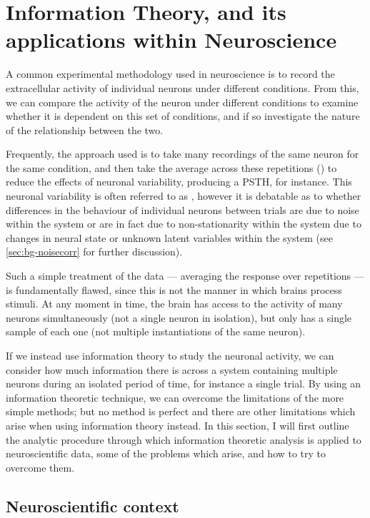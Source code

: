 \section{Information Theory, and its applications within Neuroscience}
\label{sec:bgit}

A common experimental methodology used in neuroscience is to record the extracellular activity of individual neurons under different conditions.
From this, we can compare the activity of the neuron under different conditions to examine whether it is dependent on this set of conditions, and if so investigate the nature of the relationship between the two.

Frequently, the approach used is to take many recordings of the same neuron for the same condition, and then take the average across these repetitions () to reduce the effects of neuronal variability, producing a \ac{PSTH}, for instance.
This neuronal variability is often referred to as , however it is debatable as to whether differences in the behaviour of individual neurons between trials are due to noise within the system or are in fact due to non-stationarity within the system due to changes in neural state or unknown latent variables within the system (see \autoref{sec:bg-noisecorr} for further discussion).

Such a simple treatment of the data --- averaging the response over repetitions --- is fundamentally flawed, since this is not the manner in which brains process stimuli.
At any moment in time, the brain has access to the activity of many neurons simultaneously (not a single neuron in isolation), but only has a single sample of each one (not multiple instantiations of the same neuron).

If we instead use information theory to study the neuronal activity, we can consider how much information there is across a system containing multiple neurons during an isolated period of time, for instance a single trial.
By using an information theoretic technique, we can overcome the limitations of the more simple methods; but no method is perfect and there are other limitations which arise when using information theory instead.
In this section, I will first outline the analytic procedure through which information theoretic analysis is applied to neuroscientific data, some of the problems which arise, and how to try to overcome them.


\subsection{Neuroscientific context}

